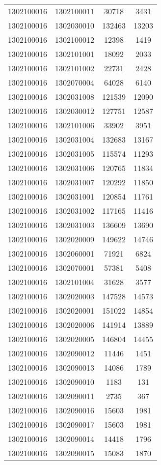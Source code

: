 \begin{longtable}[h]{llcc}
		1302100016 & 1302100011 & 30718 & 3431\\
		1302100016 & 1302030010 & 132463 & 13203\\
		1302100016 & 1302100012 & 12398 & 1419\\
		1302100016 & 1302101001 & 18092 & 2033\\
		1302100016 & 1302101002 & 22731 & 2428\\
		1302100016 & 1302070004 & 64028 & 6140\\
		1302100016 & 1302031008 & 121539 & 12090\\
		1302100016 & 1302030012 & 127751 & 12587\\
		1302100016 & 1302101006 & 33902 & 3951\\
		1302100016 & 1302031004 & 132683 & 13167\\
		1302100016 & 1302031005 & 115574 & 11293\\
		1302100016 & 1302031006 & 120765 & 11834\\
		1302100016 & 1302031007 & 120292 & 11850\\
		1302100016 & 1302031001 & 120854 & 11761\\
		1302100016 & 1302031002 & 117165 & 11416\\
		1302100016 & 1302031003 & 136609 & 13690\\
		1302100016 & 1302020009 & 149622 & 14746\\
		1302100016 & 1302060001 & 71921 & 6824\\
		1302100016 & 1302070001 & 57381 & 5408\\
		1302100016 & 1302101004 & 31628 & 3577\\
		1302100016 & 1302020003 & 147528 & 14573\\
		1302100016 & 1302020001 & 151022 & 14854\\
		1302100016 & 1302020006 & 141914 & 13889\\
		1302100016 & 1302020005 & 146804 & 14455\\
		1302100016 & 1302090012 & 11446 & 1451\\
		1302100016 & 1302090013 & 14086 & 1789\\
		1302100016 & 1302090010 & 1183 & 131\\
		1302100016 & 1302090011 & 2735 & 367\\
		1302100016 & 1302090016 & 15603 & 1981\\
		1302100016 & 1302090017 & 15603 & 1981\\
		1302100016 & 1302090014 & 14418 & 1796\\
		1302100016 & 1302090015 & 15083 & 1870\\

\end{longtable}
